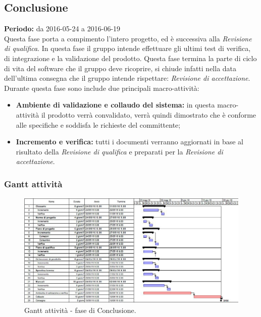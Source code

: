 \documentclass[a4paper]{article}
\begin{document}
		\subsection{Conclusione}
			\textbf{Periodo:} da 2016-05-24 a 2016-06-19 \\
			
			Questa fase porta a compimento l'intero progetto, ed è successiva alla \emph{Revisione di qualifica}. In questa fase
			il gruppo intende effettuare gli ultimi test di verifica, di integrazione e la validazione del prodotto. 
			Questa fase termina la parte di ciclo di vita del software che il gruppo deve ricoprire, si chiude infatti nella data 
			dell'ultima consegna che il gruppo intende rispettare: \emph{Revisione di accettazione}.
			Durante questa fase sono include due principali macro-attività:
			\begin{itemize}
				\item \textbf{Ambiente di validazione e collaudo del sistema:} in questa macro-attività il prodotto verrà 
				convalidato, verrà quindi dimostrato che è conforme alle specifiche e soddisfa le richieste del committente;
				\item \textbf{Incremento e verifica:} tutti i documenti verranno aggiornati in base al risultato della 
				\emph{Revisione di qualifica} e preparati per la \emph{Revisione di accettazione}.
			\end{itemize}
			\subsubsection{Gantt attività}
				\begin{figure}[H]
					\centering
					\includegraphics[scale=0.4]{gantt_conclusione}
					\caption{Gantt attività - fase di Conclusione.}
				\end{figure}
\end{document}
